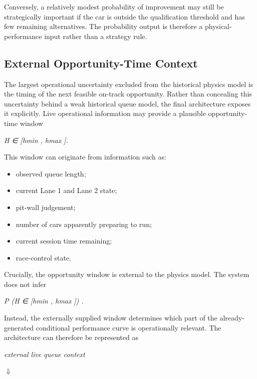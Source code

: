 Conversely, a relatively modest probability of improvement may still be strategically important if the car is outside the qualification threshold and has few remaining alternatives. The probability output is therefore a physical-performance input rather than a strategy rule.

\subsection{External Opportunity-Time Context}
The largest operational uncertainty excluded from the historical physics model is the timing of the next feasible on-track opportunity. Rather than concealing this uncertainty behind a weak historical queue model, the final architecture exposes it explicitly. Live operational information may provide a plausible opportunity-time window

\begin{center}\textit{H ∈ [hmin , hmax ].}\end{center}

This window can originate from information such as:

\begin{itemize}
\item observed queue length;
\item current Lane 1 and Lane 2 state;
\item pit-wall judgement;
\item number of cars apparently preparing to run;
\item current session time remaining;
\item race-control state.
\end{itemize}

Crucially, the opportunity window is external to the physics model. The system does not infer

\begin{center}\textit{P (H ∈ [hmin , hmax ]) .}\end{center}

Instead, the externally supplied window determines which part of the already-generated conditional performance curve is operationally relevant. The architecture can therefore be represented as

\begin{center}\textit{external live queue context}\end{center}

\begin{center}\textit{\ensuremath{\Downarrow}}\end{center}

